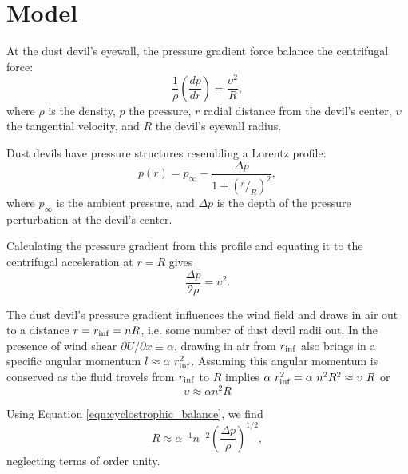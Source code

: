 \documentclass{aastex63}
\begin{document}
\section{Model} \label{sec:model}

At the dust devil's eyewall, the pressure gradient force balance the centrifugal force:
\begin{equation}
    \dfrac{1}{\rho}\left( \dfrac{dp}{dr} \right) = \dfrac{\upsilon^2}{R},
\end{equation}
where $\rho$ is the density, $p$ the pressure, $r$ radial distance from the devil's center, $\upsilon$ the tangential velocity, and $R$ the devil's eyewall radius. 

Dust devils have pressure structures resembling a Lorentz profile:
\begin{equation}
    p(r) = p_{\infty} - \dfrac{\Delta p}{1 + \left( ^r/_R \right)^2},\label{eqn:pressure_profile}
\end{equation}
where $p_{\infty}$ is the ambient pressure, and $\Delta p$ is the depth of the pressure perturbation at the devil's center.

Calculating the pressure gradient from this profile and equating it to the centrifugal acceleration at $r = R$ gives
\begin{equation}
    \dfrac{\Delta p}{2\rho} = \upsilon^2.\label{eqn:cyclostrophic_balance}
\end{equation}

The dust devil's pressure gradient influences the wind field and draws in air out to a distance $r = r_{\rm inf} = n R$, i.e. some number of dust devil radii out. In the presence of wind shear $\partial U/\partial x \equiv \alpha$, drawing in air from $r_{\rm inf}$ also brings in a specific angular momentum $l \approx \alpha\ r_{\rm inf}^2$. Assuming this angular momentum is conserved as the fluid travels from $r_{\rm inf}$ to $R$ implies $\alpha\ r_{\rm inf}^2 = \alpha\ n^2 R^2 \approx \upsilon\ R$ or 
\begin{equation}
    \upsilon \approx \alpha n^2 R
\end{equation}

Using Equation \ref{eqn:cyclostrophic_balance}, we find
\begin{equation}
    R \approx \alpha^{-1} n^{-2} \left( \dfrac{\Delta p}{\rho} \right)^{1/2},\label{eqn:R_vs_Delta-p}
\end{equation}
neglecting terms of order unity.
\end{document}
